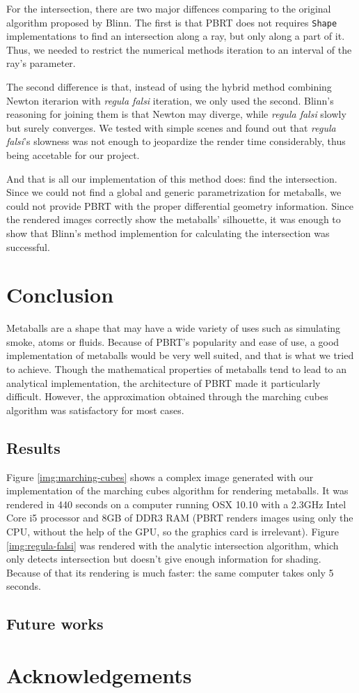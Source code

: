 \documentclass[conference]{acmsiggraph}
\begin{document}
For the intersection, there are two major diffences comparing to the original
algorithm proposed by Blinn. The first is that PBRT does not requires
\texttt{Shape} implementations to find an intersection along a ray, but only
along a part of it. Thus, we needed to restrict the numerical methods iteration
to an interval of the ray's parameter.

The second difference is that, instead of using the hybrid method combining
Newton iterarion with \textit{regula falsi} iteration, we only used the second.
Blinn's reasoning for joining them is that Newton may diverge, while
\textit{regula falsi} slowly but surely converges. We tested with simple scenes
and found out that \textit{regula falsi}'s slowness was not enough to jeopardize
the render time considerably, thus being accetable for our project.

And that is all our implementation of this method does: find the intersection.
Since we could not find a global and generic parametrization for metaballs, we
could not provide PBRT with the proper differential geometry information. Since
the rendered images correctly show the metaballs' silhouette, it was enough to
show that Blinn's method implemention for calculating the intersection was
successful.

\section{Conclusion}

Metaballs are a shape that may have a wide variety of uses such as simulating smoke, atoms or fluids. Because of PBRT's popularity and ease of use, a good implementation of metaballs would be very well suited, and that is what we tried to achieve. Though the mathematical properties of metaballs tend to lead to an analytical implementation, the architecture of PBRT made it particularly difficult. However, the approximation obtained through the marching cubes algorithm was satisfactory for most cases.

\subsection{Results}

Figure \ref{img:marching-cubes} shows a complex image generated with our implementation of the marching cubes algorithm for rendering metaballs. It was rendered in 440 seconds on a computer running OSX 10.10 with a 2.3GHz Intel Core i5 processor and 8GB of DDR3 RAM (PBRT renders images using only the CPU, without the help of the GPU, so the graphics card is irrelevant). Figure \ref{img:regula-falsi} was rendered with the analytic intersection algorithm, which only detects intersection but doesn't give enough information for shading. Because of that its rendering is much faster: the same computer takes only 5 seconds.


\subsection{Future works}

\section*{Acknowledgements}




\end{document}
